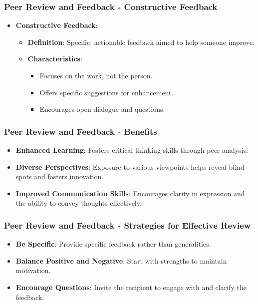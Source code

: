 \documentclass[aspectratio=169]{beamer}
\begin{document}
\begin{frame}[fragile]
    \frametitle{Peer Review and Feedback - Constructive Feedback}
    \begin{itemize}
        \item \textbf{Constructive Feedback}:
        \begin{itemize}
            \item \textbf{Definition}: Specific, actionable feedback aimed to help someone improve.
            \item \textbf{Characteristics}:
            \begin{itemize}
                \item Focuses on the work, not the person.
                \item Offers specific suggestions for enhancement.
                \item Encourages open dialogue and questions.
            \end{itemize}
        \end{itemize}
    \end{itemize}
\end{frame}

\begin{frame}[fragile]
    \frametitle{Peer Review and Feedback - Benefits}
    \begin{itemize}
        \item \textbf{Enhanced Learning}: Fosters critical thinking skills through peer analysis.
        \item \textbf{Diverse Perspectives}: Exposure to various viewpoints helps reveal blind spots and fosters innovation.
        \item \textbf{Improved Communication Skills}: Encourages clarity in expression and the ability to convey thoughts effectively.
    \end{itemize}
\end{frame}

\begin{frame}[fragile]
    \frametitle{Peer Review and Feedback - Strategies for Effective Review}
    \begin{itemize}
        \item \textbf{Be Specific}: Provide specific feedback rather than generalities.
        \item \textbf{Balance Positive and Negative}: Start with strengths to maintain motivation.
        \item \textbf{Encourage Questions}: Invite the recipient to engage with and clarify the feedback.
    \end{itemize}
\end{frame}
\end{document}
